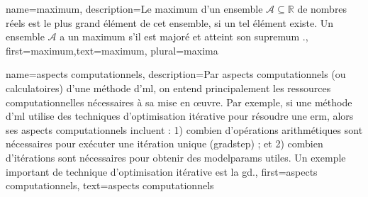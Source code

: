 {
	name=maximum,
	description={Le maximum d’un ensemble $\mathcal{A} \subseteq \mathbb{R}$ de nombres réels est le plus grand élément de cet ensemble, si un tel élément existe. Un ensemble $\mathcal{A}$ a un maximum s’il est majoré et atteint son \gls{supremum} \cite[Sec.~1.4]{RudinBookPrinciplesMatheAnalysis}.},
	first={maximum},text={maximum}, plural={maxima}
}

{
	name={aspects computationnels},
	description={Par aspects computationnels (ou calculatoires) d’une méthode d'\gls{ml}, on entend principalement les ressources computationnelles nécessaires à sa mise en œuvre. Par exemple, si une méthode d'\gls{ml} utilise des techniques d’optimisation itérative pour résoudre une \gls{erm}, alors ses aspects computationnels incluent : 1) combien d’opérations arithmétiques sont nécessaires pour exécuter une itération unique (\gls{gradstep}) ; et 2) combien d’itérations sont nécessaires pour obtenir des \gls{modelparams} utiles. Un exemple important de technique d’optimisation itérative est la \gls{gd}.},
	first={aspects computationnels},
	text={aspects computationnels}
}

